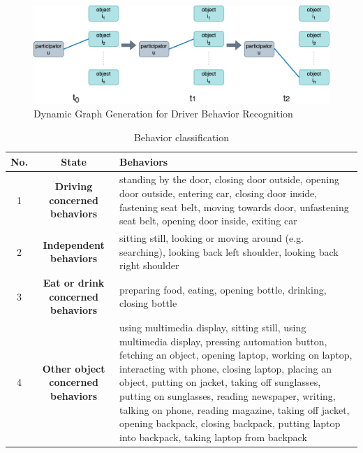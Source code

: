 \begin{figure}[h]
    \centering
    \includegraphics[width=\linewidth]{figures/04_DynamicGraph.png}
    \caption{Dynamic Graph Generation for Driver Behavior Recognition}
    \label{fig:DynamicGraph}
\end{figure}



\begin{table}[h]
    \centering
    \begin{tabular}{ccp{10cm}}
        \toprule
        \textbf{No.} & \textbf{State} & \textbf{Behaviors} \\
        \midrule
        1 & \textbf{Driving concerned behaviors} & standing by the door, closing door outside, opening door outside, entering car, closing door inside, fastening seat belt, moving towards door, unfastening seat belt, opening door inside, exiting car \\
        \midrule
        2 & \textbf{Independent behaviors} & sitting still, looking or moving around (e.g. searching), looking back left shoulder, looking back right shoulder \\
        \midrule
        3 & \textbf{Eat or drink concerned behaviors} & preparing food, eating, opening bottle, drinking, closing bottle \\
        \midrule
        4 & \textbf{Other object concerned behaviors} & using multimedia display, sitting still, using multimedia display, pressing automation button, fetching an object, opening laptop, working on laptop, interacting with phone, closing laptop, placing an object, putting on jacket, taking off sunglasses, putting on sunglasses, reading newspaper, writing, talking on phone, reading magazine, taking off jacket, opening backpack, closing backpack, putting laptop into backpack, taking laptop from backpack \\
        \bottomrule
    \end{tabular}
    \caption{Behavior classification}
    \label{tab:Behavior classification}
\end{table}



